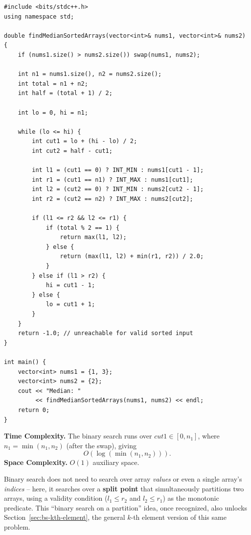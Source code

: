 \begin{lstlisting}
#include <bits/stdc++.h>
using namespace std;

double findMedianSortedArrays(vector<int>& nums1, vector<int>& nums2) {
    if (nums1.size() > nums2.size()) swap(nums1, nums2);

    int n1 = nums1.size(), n2 = nums2.size();
    int total = n1 + n2;
    int half = (total + 1) / 2;

    int lo = 0, hi = n1;

    while (lo <= hi) {
        int cut1 = lo + (hi - lo) / 2;
        int cut2 = half - cut1;

        int l1 = (cut1 == 0) ? INT_MIN : nums1[cut1 - 1];
        int r1 = (cut1 == n1) ? INT_MAX : nums1[cut1];
        int l2 = (cut2 == 0) ? INT_MIN : nums2[cut2 - 1];
        int r2 = (cut2 == n2) ? INT_MAX : nums2[cut2];

        if (l1 <= r2 && l2 <= r1) {
            if (total % 2 == 1) {
                return max(l1, l2);
            } else {
                return (max(l1, l2) + min(r1, r2)) / 2.0;
            }
        } else if (l1 > r2) {
            hi = cut1 - 1;
        } else {
            lo = cut1 + 1;
        }
    }
    return -1.0; // unreachable for valid sorted input
}

int main() {
    vector<int> nums1 = {1, 3};
    vector<int> nums2 = {2};
    cout << "Median: "
         << findMedianSortedArrays(nums1, nums2) << endl;
    return 0;
}
\end{lstlisting}

\begin{complexitybox}
\textbf{Time Complexity.} The binary search runs over $\textit{cut1} \in
[0, n_1]$, where $n_1 = \min(n_1, n_2)$ (after the swap), giving
\[
  O(\log(\min(n_1, n_2))).
\]
\textbf{Space Complexity.} $O(1)$ auxiliary space.
\end{complexitybox}

\begin{takeawaybox}
Binary search does not need to search over array \emph{values} or even a
single array's \emph{indices} -- here, it searches over a \textbf{split
point} that simultaneously partitions two arrays, using a validity
condition ($l_1 \le r_2$ and $l_2 \le r_1$) as the monotonic predicate.
This ``binary search on a partition'' idea, once recognized, also unlocks
Section~\ref{sec:bs-kth-element}, the general $k$-th element version of
this same problem.
\end{takeawaybox}
